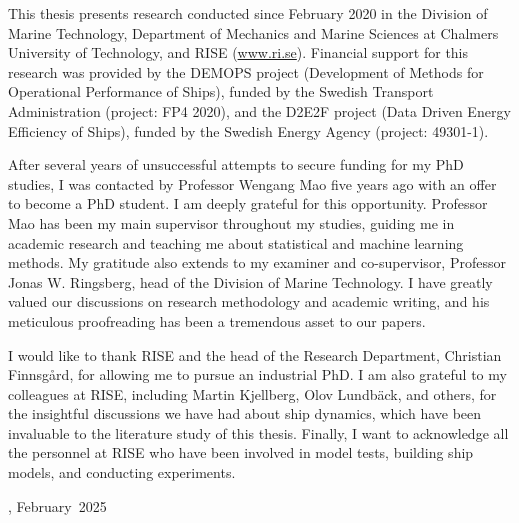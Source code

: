 This thesis presents research conducted since February 2020 in the Division of Marine Technology, Department of Mechanics and Marine Sciences at Chalmers University of Technology, and RISE (\href{www.ri.se}{www.ri.se}). Financial support for this research was provided by the DEMOPS project (Development of Methods for Operational Performance of Ships), funded by the Swedish Transport Administration (project: FP4 2020), and the D2E2F project (Data Driven Energy Efficiency of Ships), funded by the Swedish Energy Agency (project: 49301-1).

After several years of unsuccessful attempts to secure funding for my PhD studies, I was contacted by Professor Wengang Mao five years ago with an offer to become a PhD student. I am deeply grateful for this opportunity. Professor Mao has been my main supervisor throughout my studies, guiding me in academic research and teaching me about statistical and machine learning methods. My gratitude also extends to my examiner and co-supervisor, Professor Jonas W. Ringsberg, head of the Division of Marine Technology. I have greatly valued our discussions on research methodology and academic writing, and his meticulous proofreading has been a tremendous asset to our papers.

I would like to thank RISE and the head of the Research Department, Christian Finnsgård, for allowing me to pursue an industrial PhD. I am also grateful to my colleagues at RISE, including Martin Kjellberg, Olov Lundbäck, and others, for the insightful discussions we have had about ship dynamics, which have been invaluable to the literature study of this thesis. Finally, I want to acknowledge all the personnel at RISE who have been involved in model tests, building ship models, and conducting experiments.

\vskip 2pc

\noindent \thesisauthor

\noindent \thesiscity, February\ 2025 %
